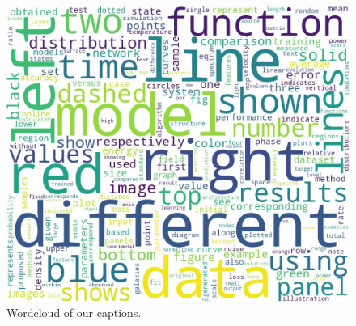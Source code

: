 \begin{figure}[tp]
    \centering
    \includegraphics[width=0.95\linewidth]{figs/word_cloud.jpg}
    \caption{Wordcloud of our captions.}
    \label{fig:word-cloud}
\end{figure}
